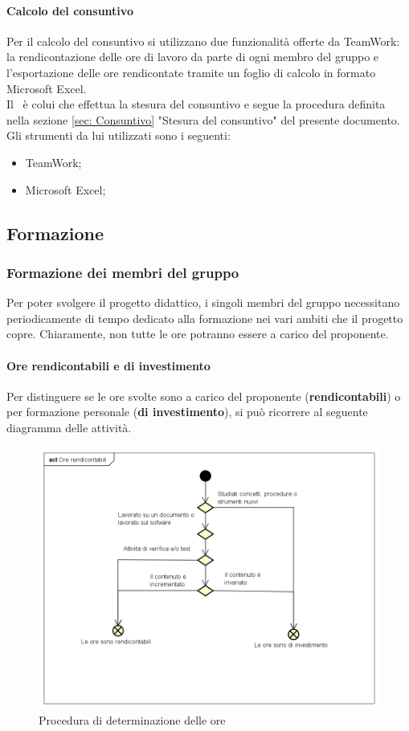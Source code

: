 \documentclass[../NormeProgetto.tex]{subfiles}
\begin{document}
			\paragraph{Calcolo del consuntivo}
				Per il calcolo del consuntivo si utilizzano due funzionalità offerte da TeamWork: la rendicontazione delle ore di lavoro da parte di ogni membro del gruppo e l'esportazione delle ore rendicontate tramite un foglio di calcolo in formato Microsoft Excel.\\
	Il \responsabilediprogetto\ è colui che effettua la stesura del consuntivo e segue la procedura definita nella sezione \ref{sec: Consuntivo} "Stesura del consuntivo" del presente documento.\\
	Gli strumenti da lui utilizzati sono i seguenti:
	\begin{itemize}
		\item TeamWork;
		\item Microsoft Excel;
	\end{itemize}
	\subsection{Formazione}
		\subsubsection{Formazione dei membri del gruppo}
			Per poter svolgere il progetto didattico, i singoli membri del gruppo necessitano periodicamente di tempo dedicato alla formazione nei vari ambiti che il progetto copre. Chiaramente, non tutte le ore potranno essere a carico del proponente.
			\paragraph{Ore rendicontabili e di investimento}
				Per distinguere se le ore svolte sono a carico del proponente (\textbf{rendicontabili}) o per formazione personale (\textbf{di investimento}), si può ricorrere al seguente diagramma delle attività.
			\begin{figure}[H]
					\centering
					\includegraphics[scale=0.5, width=\textwidth]{sections/img/oreRendicontabili.png}
					\caption{Procedura di determinazione delle ore}\label{fig:Procedura di determinazione delle ore} 
				\end{figure}
				
\end{document}
